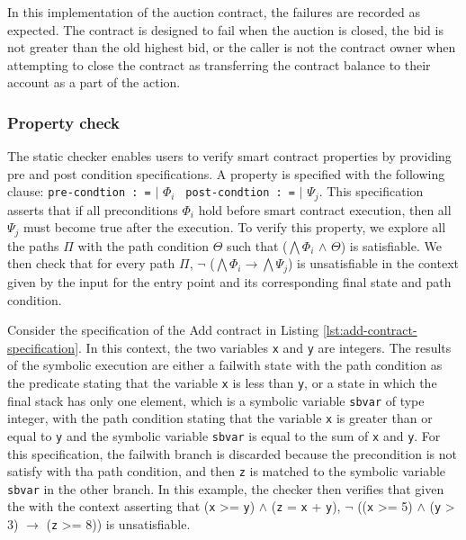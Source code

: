 \documentclass[a4paper,UKenglish,cleveref, autoref, thm-restate]{lipics-v2021}
\begin{document}
In this implementation of the auction contract, the failures are recorded as expected. The contract is designed to fail when the auction is closed, the bid is not greater than the old highest bid, or the caller is not the contract owner when attempting to close the contract as transferring the contract balance to their account as a part of the action.

\subsubsection{Property check}
The static checker enables users to verify smart contract properties by providing pre and post condition specifications. A property is specified with the following clause:  \lstinline/pre-condtion : =/ $\mid$ $\Phi_{i}$ \lstinline/ post-condtion : =/   $\mid$ $\Psi_{j}$. This specification asserts that if all preconditions $\Phi_{i}$ hold before smart contract execution, then all $\Psi_{j}$ must become true after the execution. To verify this property, we explore all the paths $\Pi$ with the path condition $\Theta$ such that ($\bigwedge \Phi_{i}$ $\land$ $\Theta$) is satisfiable. We then check that for every path $\Pi$, $\neg$ ($\bigwedge \Phi_{i} \rightarrow \bigwedge \Psi_{j}$) is unsatisfiable in the context given by the input for the entry point and its corresponding final state and path condition.

Consider the specification of the Add contract in Listing \ref{lst:add-contract-specification}. In this context, the two variables \lstinline/x/ and \lstinline/y/ are integers. The results of the symbolic execution are either a failwith state with the path condition as the predicate stating that the variable \lstinline/x/ is less than \lstinline/y/, or a state in which the final stack has only one element, which is a symbolic variable \lstinline/sbvar/ of type integer, with the path condition stating that the variable \lstinline/x/ is greater than or equal to \lstinline/y/ and the symbolic variable \lstinline/sbvar/ is equal to the sum of \lstinline/x/ and \lstinline/y/. For this specification, the failwith branch is discarded because the precondition is not satisfy with tha path condition, and then \lstinline/z/ is matched to the symbolic variable \lstinline/sbvar/ in the other branch. In this example, the checker then verifies that given the with the context asserting that (\lstinline/x/ >= \lstinline/y/) $\land$ (\lstinline/z/ = \lstinline/x/ + \lstinline/y/), $\neg$ ((\lstinline/x/ >= 5) $\land$ (\lstinline/y/ > 3) $\rightarrow$ (\lstinline/z/ >= 8)) is unsatisfiable. 
\end{document}
